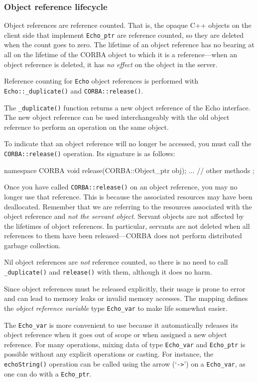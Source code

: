 \documentclass[11pt,twoside,a4paper]{book}
\newcommand{\type}[1]{\texttt{#1}}
\newcommand{\code}[1]{\texttt{#1}}
\newcommand{\op}[1]{\texttt{#1()}}
\newcommand{\term}[1]{\textit{#1}}
\newcommand{\dsc}{\discretionary{}{}{}}
\begin{document}
\subsubsection{Object reference lifecycle}

Object references are reference counted. That is, the opaque C++
objects on the client side that implement \type{Echo\_ptr} are
reference counted, so they are deleted when the count goes to zero.
The lifetime of an object reference has no bearing at all on the
lifetime of the CORBA object to which it is a reference---when an
object reference is deleted, it has \emph{no effect} on the object in
the server.

Reference counting for \type{Echo} object references is performed with
\op{Echo::\dsc{}\_duplicate} and \op{CORBA::release}.

The \op{\_duplicate} function returns a new object reference of the
Echo interface. The new object reference can be used interchangeably
with the old object reference to perform an operation on the same
object.

To indicate that an object reference will no longer be accessed, you
must call the \op{CORBA::release} operation. Its signature is as
follows:

\begin{cxxlisting}
namespace CORBA {
  void release(CORBA::Object_ptr obj);
  ... // other methods
};
\end{cxxlisting}

Once you have called \op{CORBA::release} on an object reference, you
may no longer use that reference. This is because the associated
resources may have been deallocated. Remember that we are referring to
the resources associated with the object reference and \emph{not the
  servant object}. Servant objects are not affected by the lifetimes
of object references. In particular, servants are not deleted when all
references to them have been released---CORBA does not perform
distributed garbage collection.

Nil object references are \emph{not} reference counted, so there is no
need to call \op{\_duplicate} and \op{release} with them, although it
does no harm.

Since object references must be released explicitly, their usage is
prone to error and can lead to memory leaks or invalid memory
accesses. The mapping defines the \term{object reference variable}
type \type{Echo\_var} to make life somewhat easier.

The \type{Echo\_var} is more convenient to use because it
automatically releases its object reference when it goes out of scope
or when assigned a new object reference. For many operations, mixing
data of type \type{Echo\_var} and \type{Echo\_ptr} is possible without
any explicit operations or casting. For instance, the \op{echoString}
operation can be called using the arrow (`\code{->}') on a
\type{Echo\_var}, as one can do with a \type{Echo\_ptr}.
\end{document}
